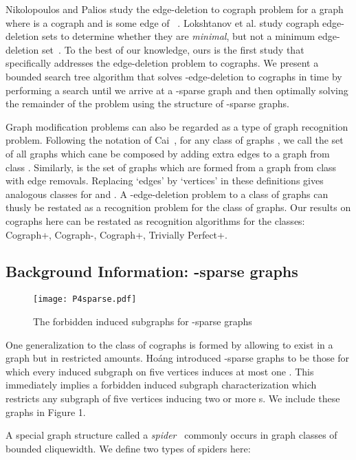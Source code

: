 \documentclass{llncs}
\begin{document}
Nikolopoulos and Palios study the edge-deletion to cograph problem for a graph  where  is a cograph and  is some edge of ~\cite{NikoPalio}. Lokshtanov et al. study cograph edge-deletion sets to determine whether they are \emph{minimal}, but not a minimum edge-deletion set~\cite{LMP}. To the best of our knowledge, ours is the first study that specifically addresses the edge-deletion problem to cographs. We present a bounded search tree algorithm that solves -edge-deletion to cographs in  time by performing a search until we arrive at a -sparse graph and then optimally solving the remainder of the problem using the structure of -sparse graphs.

Graph modification problems can also be regarded as a type of graph recognition problem. Following the notation of Cai~\cite{CAI}, for any class of graphs , we call  the set of all graphs which cane be composed by adding  extra edges to a graph from class . Similarly,  is the set of graphs which are formed from a graph from class  with  edge removals. Replacing `edges' by `vertices' in these definitions gives analogous classes for  and . A -edge-deletion problem to a class of graphs  can thusly be restated as a recognition problem for the class of  graphs. Our results on cographs here can be restated as recognition algorithms for the classes: Cograph+, Cograph-, Cograph+, Trivially Perfect+.

\subsection{Background Information: -sparse graphs}

\begin{figure}
  \texttt{[image: P4sparse.pdf]}\\
  \caption{The forbidden induced subgraphs for -sparse graphs}\label{forb}
\end{figure}

One generalization to the class of cographs is formed by allowing  to exist in a graph but in restricted amounts. Ho\'ang \cite{Hoa} introduced -sparse graphs to be those for which every induced subgraph on five vertices induces at most one . This immediately implies a forbidden induced subgraph characterization which restricts any subgraph of five vertices inducing two or more s. We include these graphs in Figure 1.

A special graph structure called a \emph{spider}~\cite{JaOl} commonly occurs in graph classes of bounded cliquewidth. We define two types of spiders here:
\end{document}

